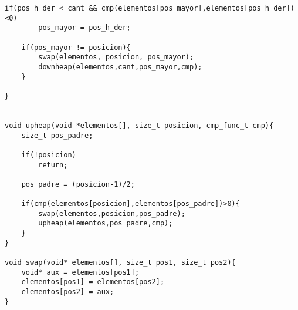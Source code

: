 \documentclass[11pt,a4paper]{article}
\begin{document}
\begin{lstlisting}[style= c]
	if(pos_h_der < cant && cmp(elementos[pos_mayor],elementos[pos_h_der]) <0)
		pos_mayor = pos_h_der;

	if(pos_mayor != posicion){
		swap(elementos, posicion, pos_mayor);
		downheap(elementos,cant,pos_mayor,cmp);
	}

}


void upheap(void *elementos[], size_t posicion, cmp_func_t cmp){
	size_t pos_padre;

	if(!posicion)
		return;

	pos_padre = (posicion-1)/2;

	if(cmp(elementos[posicion],elementos[pos_padre])>0){
		swap(elementos,posicion,pos_padre);
		upheap(elementos,pos_padre,cmp);
	}
}

void swap(void* elementos[], size_t pos1, size_t pos2){
	void* aux = elementos[pos1];
	elementos[pos1] = elementos[pos2];
	elementos[pos2] = aux;
}

\end{lstlisting}
\newpage
\end{document}
